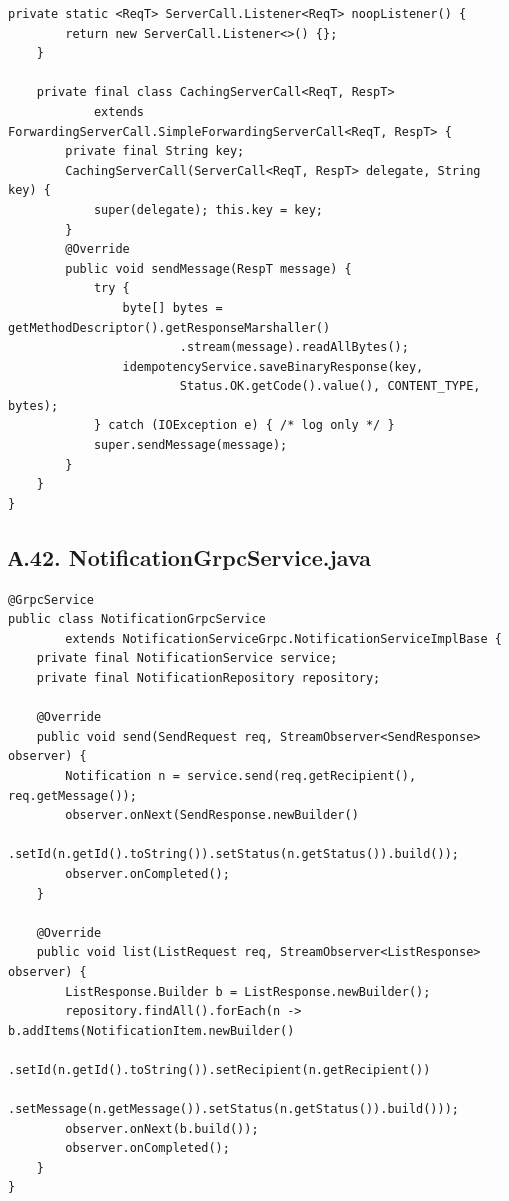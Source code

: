 \begin{lstlisting}[caption={Transport-generic перехватчик: переиспользует IdempotencyService}]
    private static <ReqT> ServerCall.Listener<ReqT> noopListener() {
        return new ServerCall.Listener<>() {};
    }

    private final class CachingServerCall<ReqT, RespT>
            extends ForwardingServerCall.SimpleForwardingServerCall<ReqT, RespT> {
        private final String key;
        CachingServerCall(ServerCall<ReqT, RespT> delegate, String key) {
            super(delegate); this.key = key;
        }
        @Override
        public void sendMessage(RespT message) {
            try {
                byte[] bytes = getMethodDescriptor().getResponseMarshaller()
                        .stream(message).readAllBytes();
                idempotencyService.saveBinaryResponse(key,
                        Status.OK.getCode().value(), CONTENT_TYPE, bytes);
            } catch (IOException e) { /* log only */ }
            super.sendMessage(message);
        }
    }
}
\end{lstlisting}

\subsection*{А.42. NotificationGrpcService.java}
\begin{lstlisting}[caption={Реализация gRPC-сервиса (@GrpcService)}]
@GrpcService
public class NotificationGrpcService
        extends NotificationServiceGrpc.NotificationServiceImplBase {
    private final NotificationService service;
    private final NotificationRepository repository;

    @Override
    public void send(SendRequest req, StreamObserver<SendResponse> observer) {
        Notification n = service.send(req.getRecipient(), req.getMessage());
        observer.onNext(SendResponse.newBuilder()
                .setId(n.getId().toString()).setStatus(n.getStatus()).build());
        observer.onCompleted();
    }

    @Override
    public void list(ListRequest req, StreamObserver<ListResponse> observer) {
        ListResponse.Builder b = ListResponse.newBuilder();
        repository.findAll().forEach(n -> b.addItems(NotificationItem.newBuilder()
                .setId(n.getId().toString()).setRecipient(n.getRecipient())
                .setMessage(n.getMessage()).setStatus(n.getStatus()).build()));
        observer.onNext(b.build());
        observer.onCompleted();
    }
}
\end{lstlisting}


